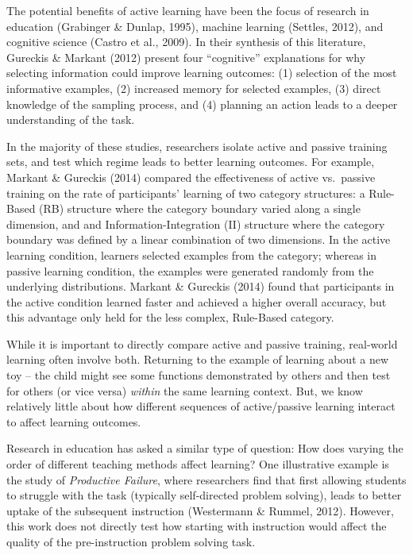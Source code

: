 \documentclass[10pt, letterpaper]{article}
\begin{document}
The potential benefits of active learning have been the focus of
research in education (Grabinger \& Dunlap, 1995), machine learning
(Settles, 2012), and cognitive science (Castro et al., 2009). In their
synthesis of this literature, Gureckis \& Markant (2012) present four
``cognitive'' explanations for why selecting information could improve
learning outcomes: (1) selection of the most informative examples, (2)
increased memory for selected examples, (3) direct knowledge of the
sampling process, and (4) planning an action leads to a deeper
understanding of the task.

In the majority of these studies, researchers isolate active and passive
training sets, and test which regime leads to better learning outcomes.
For example, Markant \& Gureckis (2014) compared the effectiveness of
active vs.~passive training on the rate of participants' learning of two
category structures: a Rule-Based (RB) structure where the category
boundary varied along a single dimension, and and
Information-Integration (II) structure where the category boundary was
defined by a linear combination of two dimensions. In the active
learning condition, learners selected examples from the category;
whereas in passive learning condition, the examples were generated
randomly from the underlying distributions. Markant \& Gureckis (2014)
found that participants in the active condition learned faster and
achieved a higher overall accuracy, but this advantage only held for the
less complex, Rule-Based category.

While it is important to directly compare active and passive training,
real-world learning often involve both. Returning to the example of
learning about a new toy -- the child might see some functions
demonstrated by others and then test for others (or vice versa)
\emph{within} the same learning context. But, we know relatively little
about how different sequences of active/passive learning interact to
affect learning outcomes.

Research in education has asked a similar type of question: How does
varying the order of different teaching methods affect learning? One
illustrative example is the study of \emph{Productive Failure}, where
researchers find that first allowing students to struggle with the task
(typically self-directed problem solving), leads to better uptake of the
subsequent instruction (Westermann \& Rummel, 2012). However, this work
does not directly test how starting with instruction would affect the
quality of the pre-instruction problem solving task.
\end{document}
